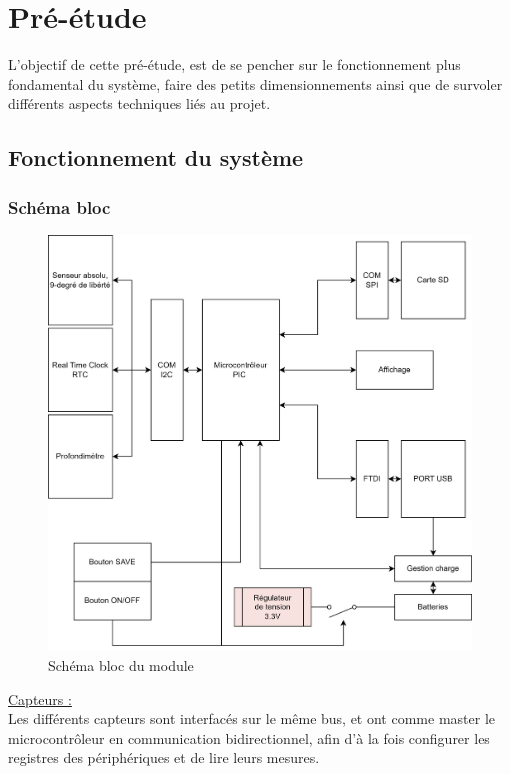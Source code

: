 \section{Pré-étude}
L'objectif de cette pré-étude, est de se pencher sur le fonctionnement plus fondamental du système, faire des petits dimensionnements ainsi que de survoler différents aspects techniques liés au projet.
\subsection{Fonctionnement du système} \label{ssec:num01}
{
\subsubsection{Schéma bloc}

\begin{figure}[h]
    \centering
    \includegraphics[width=.9\textwidth]{Figures/Schema-bloc-LocalisationSousMarin.drawio}
    \caption{Schéma bloc du module}
    \label{fig:SchemaBloc}
\end{figure}

\clearpage

\underline{Capteurs :} 
\\ Les différents capteurs sont interfacés sur le même bus, et ont comme master le microcontrôleur en communication bidirectionnel, afin d'à la fois configurer les registres des périphériques et de lire leurs mesures.\\

}
